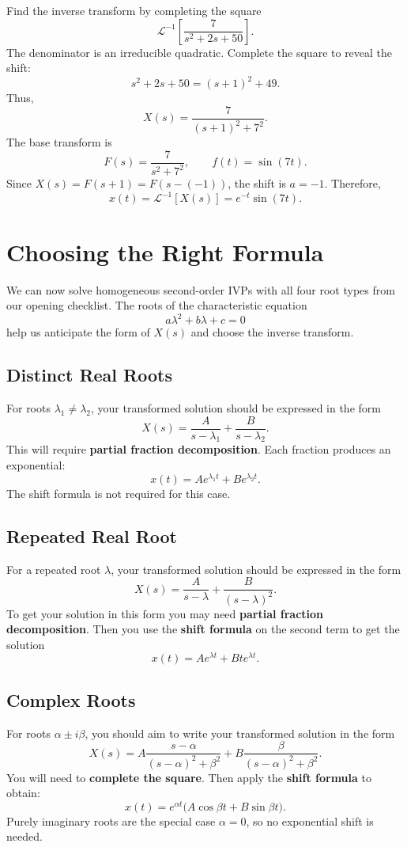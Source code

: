\documentclass[10pt,letterpaper]{article}
\begin{document}
\begin{example}[7]{
Find the inverse transform by completing the square
\[
\mathcal{L}^{-1}\left[\frac{7}{s^2+2s+50}\right].
\]
}
The denominator is an irreducible quadratic. Complete
the square to reveal the shift:
\[
s^2+2s+50=(s+1)^2+49.
\]
Thus,
\[
X(s)=\frac{7}{(s+1)^2+7^2}.
\]
The base transform is
\[
F(s)=\frac{7}{s^2+7^2},
\qquad
f(t)=\sin(7t).
\]
Since $X(s)=F(s+1)=F(s-(-1))$, the shift is $a=-1$.
Therefore,
\[
\boxed{
x(t)=\mathcal{L}^{-1}[X(s)]=e^{-t}\sin(7t).
}
\]
\end{example}
\section{Choosing the Right Formula}

We can now solve homogeneous second-order IVPs with
all four root types from our opening checklist.
The roots of the characteristic equation
\[
a\lambda^2+b\lambda+c=0
\]
help us anticipate the form of $X(s)$ and choose
the inverse transform.

\subsection{Distinct Real Roots}
For roots $\lambda_1\ne\lambda_2$, your transformed solution should be expressed in the form
\[
X(s)=\frac{A}{s-\lambda_1}+\frac{B}{s-\lambda_2}.
\]
This will require \textbf{partial fraction decomposition}. Each fraction produces an exponential:
\[
x(t)=Ae^{\lambda_1t}+Be^{\lambda_2t}.
\]
The shift formula is not required for this case.

\subsection{Repeated Real Root}
For a repeated root $\lambda$, your transformed solution should be expressed in the form
\[
X(s)=\frac{A}{s-\lambda}+\frac{B}{(s-\lambda)^2}.
\]
To get your solution in this form you may need \textbf{partial fraction decomposition}. Then you use the \textbf{shift formula} on the second term to get the solution 
\[
x(t)=Ae^{\lambda t}+Bte^{\lambda t}.
\]

\subsection{Complex Roots}
For roots $\alpha\pm i\beta$, you should aim to write your transformed solution in the form
\[
X(s)=
A\frac{s-\alpha}{(s-\alpha)^2+\beta^2}
+B\frac{\beta}{(s-\alpha)^2+\beta^2}.
\]
You will need to \textbf{complete the square}. Then apply the \textbf{shift formula} to obtain:
\[
x(t)=e^{\alpha t}\bigl(A\cos\beta t+B\sin\beta t\bigr).
\]
Purely imaginary roots are the special case $\alpha=0$,
so no exponential shift is needed.
\end{document}
